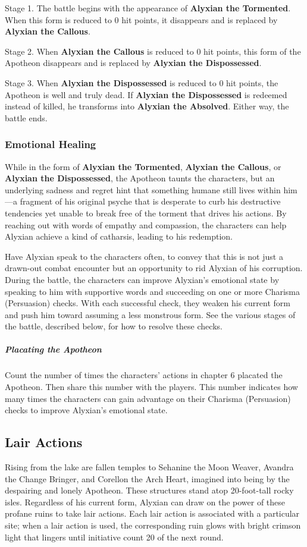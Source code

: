 \documentclass[10pt,a4paper,twoside,bg=print,twocolumn,openany,nodeprecatedcode]{dndbook}
\begin{document}
Stage 1. The battle begins with the appearance of \textbf{Alyxian the Tormented}. When this form is reduced to 0 hit points, it disappears and is replaced by \textbf{Alyxian the Callous}.

Stage 2. When \textbf{Alyxian the Callous} is reduced to 0 hit points, this form of the Apotheon disappears and is replaced by \textbf{Alyxian the Dispossessed}.

Stage 3. When \textbf{Alyxian the Dispossessed} is reduced to 0 hit points, the Apotheon is well and truly dead. If \textbf{Alyxian the Dispossessed} is redeemed instead of killed, he transforms into \textbf{Alyxian the Absolved}. Either way, the battle ends.

\subsubsection{Emotional Healing}
While in the form of \textbf{Alyxian the Tormented}, \textbf{Alyxian the Callous}, or \textbf{Alyxian the Dispossessed}, the Apotheon taunts the characters, but an underlying sadness and regret hint that something humane still lives within him—a fragment of his original psyche that is desperate to curb his destructive tendencies yet unable to break free of the torment that drives his actions. By reaching out with words of empathy and compassion, the characters can help Alyxian achieve a kind of catharsis, leading to his redemption.

Have Alyxian speak to the characters often, to convey that this is not just a drawn-out combat encounter but an opportunity to rid Alyxian of his corruption. During the battle, the characters can improve Alyxian's emotional state by speaking to him with supportive words and succeeding on one or more Charisma (Persuasion) checks. With each successful check, they weaken his current form and push him toward assuming a less monstrous form. See the various stages of the battle, described below, for how to resolve these checks.

\subparagraph{Placating the Apotheon}
Count the number of times the characters' actions in chapter 6 placated the Apotheon. Then share this number with the players. This number indicates how many times the characters can gain advantage on their Charisma (Persuasion) checks to improve Alyxian's emotional state.

\subsection{Lair Actions}
Rising from the lake are fallen temples to Sehanine the Moon Weaver, Avandra the Change Bringer, and Corellon the Arch Heart, imagined into being by the despairing and lonely Apotheon. These structures stand atop 20-foot-tall rocky isles. Regardless of his current form, Alyxian can draw on the power of these profane ruins to take lair actions. Each lair action is associated with a particular site; when a lair action is used, the corresponding ruin glows with bright crimson light that lingers until initiative count 20 of the next round.
\end{document}
